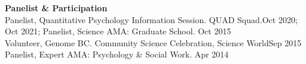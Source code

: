 {\large \textbf{Panelist \& Participation}}\\
Panelist, Quantitative Psychology Information Session. QUAD Squad.\hfill{Oct 2020; Oct 2021;}\newline 
{}
Panelist, Science AMA: Graduate School. \hfill{Oct 2015}\smallskip\\
Volunteer, Genome BC. Community Science Celebration, Science World\hfill{Sep 2015}\smallskip\\
Panelist, Expert AMA: Psychology \& Social Work. \hfill{Apr 2014}%

